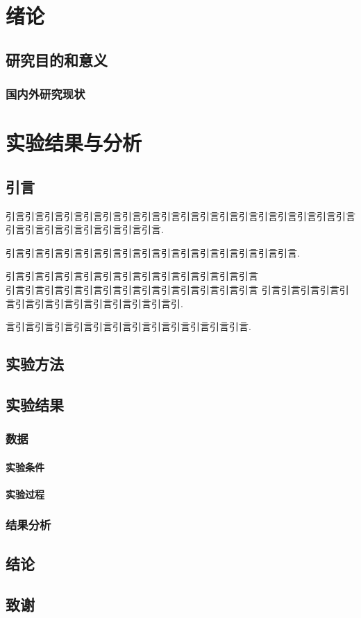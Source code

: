 \documentclass{ctexbook}%
\begin{document}
	\tableofcontents%
	
	\chapter{绪论}%
	\section{研究目的和意义}
	\subsection{国内外研究现状}
	
	
	\chapter{实验结果与分析}
	\section{引言}
	引言引言引言引言引言引言引言引言引言引言引言引言引言引言引言引言引言引言引言引言引言引言引言引言引言引言.
	
	引言引言引言引言引言引言引言引言引言引言引言引言引言引言引言.
	
	引言引言引言引言引言引言引言引言引言引言引言引言引言\\引言引言引言引言引言引言引言引言引言引言引言引言引言
	引言引言引言引言引言引言引言引言引言引言引言引言引言引. \par 言引言引言引言引言引言引言引言引言引言引言引言引言.
	\section{实验方法}
	\section{实验结果}
	\subsection{数据}%
	\subsubsection{实验条件}%
	\subsubsection{实验过程}
	\subsection{结果分析}
	\section{结论}
	\section{致谢}
\end{document}
